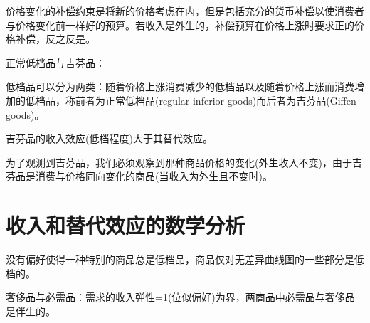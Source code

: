 \documentclass{article}
\begin{document}
价格变化的补偿约束是将新的价格考虑在内，但是包括充分的货币补偿以使消费者与价格变化前一样好的预算。若收入是外生的，补偿预算在价格上涨时要求正的价格补偿，反之反是。

\hspace*{\fill}

正常低档品与吉芬品：

低档品可以分为两类：随着价格上涨消费减少的低档品以及随着价格上涨而消费增加的低档品，称前者为正常低档品(regular inferior goods)而后者为吉芬品(Giffen goods)。

吉芬品的收入效应(低档程度)大于其替代效应。

为了观测到吉芬品，我们必须观察到那种商品价格的变化(外生收入不变)，由于吉芬品是消费与价格同向变化的商品(当收入为外生且不变时)。

\section{收入和替代效应的数学分析}

没有偏好使得一种特别的商品总是低档品，商品仅对无差异曲线图的一些部分是低档的。

奢侈品与必需品：需求的收入弹性=1(位似偏好)为界，两商品中必需品与奢侈品是伴生的。
\end{document}

